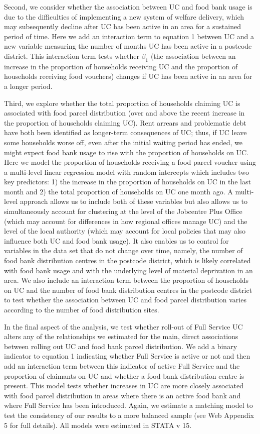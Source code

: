 \documentclass[12pt,article,oneside]{memoir}
\begin{document}
Second, we consider whether the association between UC and food bank usage is due to the difficulties of implementing a new system of welfare delivery, which may subsequently decline after UC has been active in an area for a sustained period of time. Here we add an interaction term to equation 1 between UC and a new variable measuring the number of months UC has been active in a postcode district. This interaction term tests whether $\beta_1$ (the association between an increase in the proportion of households receiving UC and the proportion of households receiving food vouchers) changes if UC has been active in an area for a longer period. 

Third, we explore whether the total proportion of households claiming UC is associated with food parcel distribution (over and above the recent increase in the proportion of households claiming UC). Rent arrears and problematic debt have both been identified as longer-term consequences of UC; thus, if UC leave some households worse off, even after the initial waiting period has ended, we might expect food bank usage to rise with the proportion of households on UC. Here we model the proportion of households receiving a food parcel voucher using a multi-level linear regression model with random intercepts which includes two key predictors: 1) the increase in the proportion of households on UC in the last month and 2) the total proportion of households on UC one month ago. A multi-level approach allows us to include both of these variables but also allows us to simultaneously account for clustering at the level of the Jobcentre Plus Office (which may account for differences in how regional offices manage UC) and the level of the local authority (which may account for local policies that may also influence both UC and food bank usage). It also enables us to control for variables in the data set that do not change over time, namely, the number of food bank distribution centres in the postcode district, which is likely correlated with food bank usage and with the underlying level of material deprivation in an area. We also include an interaction term between the proportion of households on UC and the number of food bank distribution centres in the postcode district to test whether the association between UC and food parcel distribution varies according to the number of food distribution sites. 

In the final aspect of the analysis, we test whether roll-out of Full Service UC alters any of the relationships we estimated for the main, direct associations between rolling out UC and food bank parcel distribution. We add a binary indicator to equation 1 indicating whether Full Service is active or not and then add an interaction term between this indicator of active Full Service and the proportion of claimants on UC and whether a food bank distribution centre is present. This model tests whether increases in UC are more closely associated with food parcel distribution in areas where there is an active food bank and where Full Service has been introduced. Again, we estimate a matching model to test the consistency of our results to a more balanced sample (see Web Appendix 5 for full details). All models were estimated in STATA v 15. 
\end{document}
